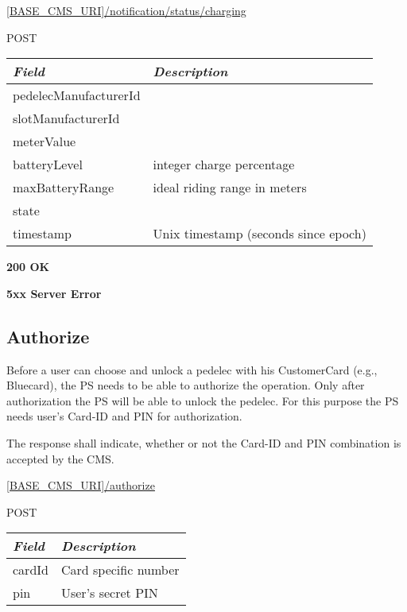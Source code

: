  \url{[BASE_CMS_URI]/notification/status/charging}

 POST

\newpage
{}
\begin{table}[!h]
\vspace{-7mm}
\begin{tabularx}{\linewidth}{ | l | X | }
  \hline
  \textit{Field} & \textit{Description} \\
  \hline \hline
  	pedelecManufacturerId			& \\
  	slotManufacturerId					& \\
  	meterValue & \\
  	batteryLevel & integer charge percentage \\
  	maxBatteryRange & ideal riding range in meters \\
  	state			& \\
 	timestamp			& Unix timestamp (seconds since epoch) \\
  	
    \hline
\end{tabularx}
\end{table}

 \textbf{200 OK}

 \textbf{5xx Server Error}

\subsection{Authorize}

Before a user can choose and unlock a pedelec with his CustomerCard (e.g., Bluecard), the \acs{PS} needs to be able to authorize the operation. Only after authorization the \acs{PS} will be able to unlock the pedelec. For this purpose the \acs{PS} needs user's Card-ID and PIN for authorization.

The response shall indicate, whether or not the Card-ID and PIN combination is accepted by the \acs{CMS}.

 \url{[BASE_CMS_URI]/authorize}

 POST

\begin{table}[!h]
\vspace{-7mm}
\begin{tabularx}{\linewidth}{ | l | X | }
  \hline
  \textit{Field} & \textit{Description} \\
  \hline \hline
  	cardId 		& Card specific number\\
  	pin			& User's secret PIN \\
    \hline
\end{tabularx}
\end{table}

